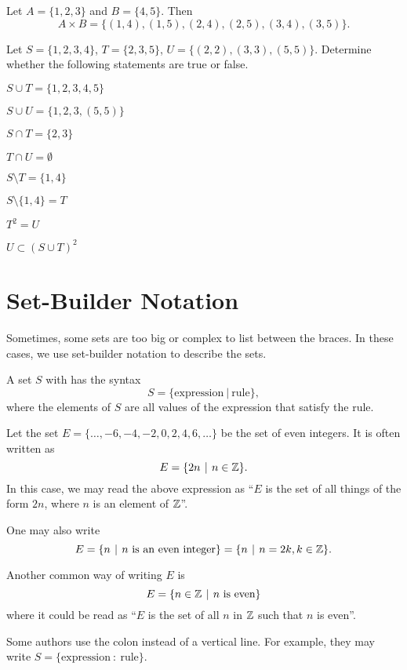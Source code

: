 \begin{example}
    Let $A = \{1, 2, 3\}$ and $B = \{4, 5\}$. Then
    \[
        A \times B = \{(1, 4), (1, 5), (2, 4), (2, 5), (3, 4), (3, 5)\}.
    \]
\end{example}

\begin{exercise}
    Let $S = \{1, 2, 3, 4\}$, $T = \{2, 3, 5\}$, $U = \{(2, 2), (3, 3), (5, 5)\}$. Determine whether the following statements are true or false.
    \begin{multicols}{2}
        \begin{partquestions}{\alph*}
            \item $S \cup T = \{1, 2, 3, 4, 5\}$
            \item $S \cup U = \{1, 2, 3, (5, 5)\}$
            \item $S \cap T = \{2, 3\}$
            \item $T \cap U = \emptyset$
            \item $S \setminus T = \{1, 4\}$
            \item $S \setminus \{1, 4\} = T$
            \item $T^2 = U$
            \item $U \subset (S \cup T)^2$
        \end{partquestions}
    \end{multicols}
\end{exercise}

\section{Set-Builder Notation}
Sometimes, some sets are too big or complex to list between the braces. In these cases, we use set-builder notation to describe the sets.
\begin{definition}
    A set $S$ with  has the syntax
    \[
        S = \{\mathrm{expression} \ | \ \mathrm{rule}\},
    \]
    where the elements of $S$ are all values of the expression that satisfy the rule.
\end{definition}

\begin{example}
    Let the set $E = \{\dots, -6, -4, -2, 0, 2, 4, 6, \dots\}$ be the set of even integers. It is often written as
    \[
        E = \{2n \vert n \in \Z\}.
    \]
    In this case, we may read the above expression as ``$E$ is the set of all things of the form $2n$, where $n$ is an element of $\mathbb{Z}$''.

    One may also write
    \[
        E = \{n \vert n \textrm{ is an even integer}\} = \{n \vert n = 2k, k \in \Z\}.
    \]

    Another common way of writing $E$ is
    \[
        E = \{n \in \Z \vert n \textrm{ is even}\}
    \]
    where it could be read as ``$E$ is the set of all $n$ in $\mathbb{Z}$ such that $n$ is even''.
\end{example}
\begin{remark}
    Some authors use the colon instead of a vertical line. For example, they may write $S = \{\mathrm{expression} \ : \ \mathrm{rule}\}$.
\end{remark}

